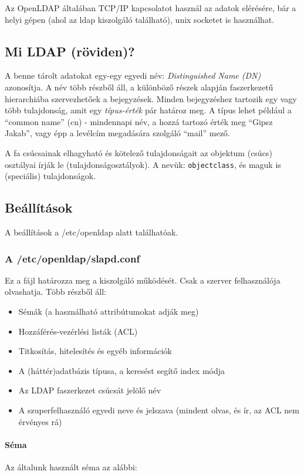 \documentclass[fleqn,10pt,a4paper,titlepage]{article}
\begin{document}
  Az OpenLDAP általában TCP/IP kapcsolatot használ az adatok elérésére, bár a helyi gépen (ahol az ldap kiszolgáló
  található), unix socketet is használhat.
  
  \subsection{Mi LDAP (röviden)?}
  A benne tárolt adatokat egy-egy egyedi név: {\em Distinguished Name (DN)} azonosítja. A név több részből áll, a
  különböző részek alapján faszerkezetű hierarchiába szervezhetőek a bejegyzések. Minden bejegyzéshez tartozik egy vagy
  több tulajdonság, amit egy {\em típus-érték} pár határoz meg. A típus lehet például a ``common name'' (cn) - mindennapi
  név, a hozzá tartozó érték meg ``Gipsz Jakab'', vagy épp a levélcím megadására szolgáló ``mail'' mező.

  A fa csúcsainak elhagyható és kötelező tulajdonságait az objektum (csúcs) osztályai írják le
  (tulajdonságosztályok). A nevük: \texttt{objectclass}, és maguk is (speciális) tulajdonságok.

  \subsection{Beállítások}
  A beállítások a /etc/openldap alatt találhatóak.

  \subsubsection{A /etc/openldap/slapd.conf}
  Ez a fájl határozza meg a kiszolgáló működését. Csak a szerver felhasználója olvashatja. Több részből áll:
  \begin{itemize}
  \item Sémák (a használható attribútumokat adják meg)
  \item Hozzáférés-vezérlési listák (ACL)
  \item Titkosítás, hitelesítés és egyéb információk
  \item A (háttér)adatbázis típusa, a keresést segítő index módja
  \item Az LDAP faszerkezet csúcsát jelölő név
  \item A szuperfelhasználó egyedi neve és jelszava (mindent olvas, és ír, az ACL nem érvényes rá)
  \end{itemize}  

  \paragraph{Séma} Az általunk használt séma az alábbi:
\end{document}
